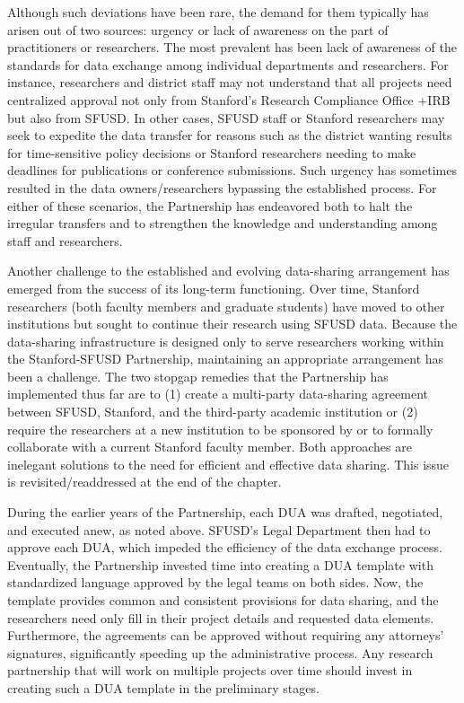 \documentclass[
]{book}
\begin{document}
Although such deviations have been rare, the demand for them typically has arisen out of two sources: urgency or lack of awareness on the part of practitioners or researchers. The most prevalent has been lack of awareness of the standards for data exchange among individual departments and researchers. For instance, researchers and district staff may not understand that all projects need centralized approval not only from Stanford's Research Compliance Office +IRB\textbar{} but also from SFUSD. In other cases, SFUSD staff or Stanford researchers may seek to expedite the data transfer for reasons such as the district wanting results for time-sensitive policy decisions or Stanford researchers needing to make deadlines for publications or conference submissions. Such urgency has sometimes resulted in the data owners/researchers bypassing the established process. For either of these scenarios, the Partnership has endeavored both to halt the irregular transfers and to strengthen the knowledge and understanding among staff and researchers.

Another challenge to the established and evolving data-sharing arrangement has emerged from the success of its long-term functioning. Over time, Stanford researchers (both faculty members and graduate students) have moved to other institutions but sought to continue their research using SFUSD data. Because the data-sharing infrastructure is designed only to serve researchers working within the Stanford-SFUSD Partnership, maintaining an appropriate arrangement has been a challenge. The two stopgap remedies that the Partnership has implemented thus far are to (1) create a multi-party data-sharing agreement between SFUSD, Stanford, and the third-party academic institution or (2) require the researchers at a new institution to be sponsored by or to formally collaborate with a current Stanford faculty member. Both approaches are inelegant solutions to the need for efficient and effective data sharing. This issue is revisited/readdressed at the end of the chapter.

During the earlier years of the Partnership, each DUA was drafted, negotiated, and executed anew, as noted above. SFUSD's Legal Department then had to approve each DUA, which impeded the efficiency of the data exchange process. Eventually, the Partnership invested time into creating a DUA template with standardized language approved by the legal teams on both sides. Now, the template provides common and consistent provisions for data sharing, and the researchers need only fill in their project details and requested data elements. Furthermore, the agreements can be approved without requiring any attorneys' signatures, significantly speeding up the administrative process. Any research partnership that will work on multiple projects over time should invest in creating such a DUA template in the preliminary stages.
\end{document}
